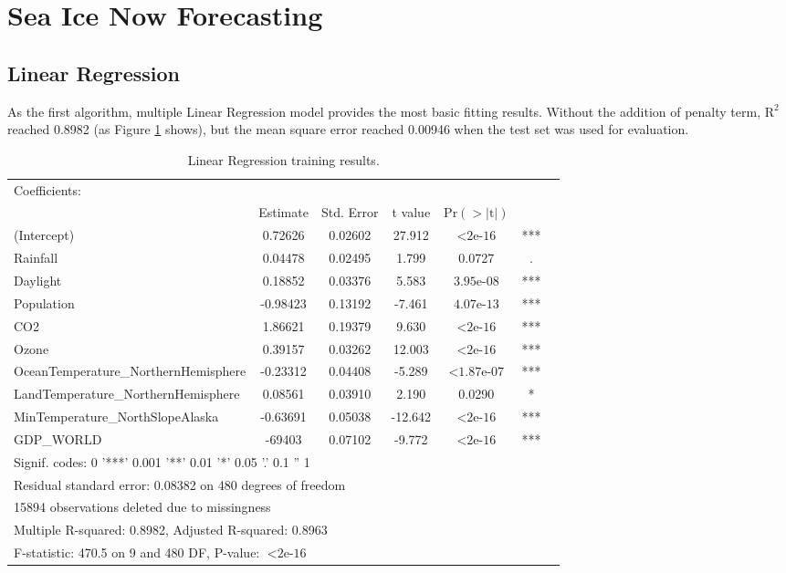 \section{Sea Ice Now Forecasting} %

\subsection{Linear Regression} %

As the first algorithm, multiple Linear Regression model provides the most basic fitting results. Without the addition of penalty term, $\text{R}^2$ reached 0.8982 (as Figure \ref{4.2.1-LR-Training-Results} shows), but the mean square error reached 0.00946 when the test set was used for evaluation.

\begin{table}[htbp]
  \centering
  \footnotesize
  \begin{tabular}{p{5.75cm} | c c c c c c}
  \toprule
  Coefficients: \\ %
    & Estimate & Std. Error & t value & $\text{Pr}(>|\text{t}|)$\\
  \hline
  (Intercept) & 0.72626 & 0.02602 & 27.912 & $< \text{2e-16}$ & ***\\
  Rainfall & 0.04478 & 0.02495 & 1.799 & 0.0727 & .\\
  Daylight & 0.18852 & 0.03376 & 5.583 & $\text{3.95e-08}$ & ***\\
  Population & -0.98423 & 0.13192 & -7.461 & $\text{4.07e-13}$ & ***\\
  CO2 & 1.86621 & 0.19379 & 9.630 & $< \text{2e-16}$ & ***\\
  Ozone & 0.39157 & 0.03262 & 12.003 & $< \text{2e-16}$ & ***\\
  OceanTemperature\_NorthernHemisphere & -0.23312 & 0.04408 & -5.289 & $< \text{1.87e-07}$ & ***\\
  LandTemperature\_NorthernHemisphere & 0.08561 & 0.03910 & 2.190 & 0.0290 & *\\
  MinTemperature\_NorthSlopeAlaska & -0.63691 & 0.05038 & -12.642 & $< \text{2e-16}$ & ***\\
  GDP\_WORLD & -69403 & 0.07102 & -9.772 & $< \text{2e-16}$ & ***\\
  \hline
  \multicolumn{6}{l}{Signif. codes: 0 '***' 0.001 '**' 0.01 '*' 0.05 '.' 0.1 '' 1} \\
  \multicolumn{6}{l}{Residual standard error: 0.08382 on 480 degrees of freedom}\\
  \multicolumn{6}{l}{   15894 observations deleted due to missingness}\\
  \multicolumn{6}{l}{Multiple R-squared: 0.8982,      Adjusted R-squared: 0.8963}\\
  \multicolumn{6}{l}{F-statistic: 470.5 on 9 and 480 DF, P-value: $< \text{2e-16}$}\\
  \bottomrule
  \end{tabular}
  \caption{Linear Regression training results.}
  \label{4.2.1-LR-Training-Results}
\end{table}



